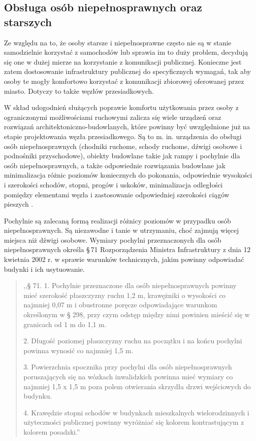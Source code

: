 \documentclass[twoside,12pt]{article}
\begin{document}
	 \clearpage
	 \subsection{Obsługa osób niepełnosprawnych oraz starszych}
	 
	 Ze względu na to, że osoby starsze i niepełnosprawne często nie są w stanie samodzielnie korzystać z samochodów lub sprawia im to duży problem, decydują się one w dużej mierze na korzystanie z komunikacji publicznej. Konieczne jest zatem dostosowanie infrastruktury publicznej do specyficznych wymagań, tak aby osoby te mogły komfortowo korzystać z komunikacji zbiorowej oferowanej przez miasto. Dotyczy to także węzłów przesiadkowych.
	 
	 W skład udogodnień służących poprawie komfortu użytkowania przez osoby z ograniczonymi możliwościami ruchowymi zalicza się wiele urządzeń oraz rozwiązań architektoniczno-budowlanych, które powinny być uwzględnione już na etapie projektowania węzła przesiadkowego. Są to m. in. urządzenia do obsługi osób niepełnosprawnych (chodniki ruchome, schody ruchome, dźwigi osobowe i podnośniki przyschodowe), obiekty budowlane takie jak rampy i pochylnie dla osób niepełnosprawnych, a także odpowiednie rozwiązania budowlane jak minimalizacja różnic poziomów koniecznych do pokonania, odpowiednie wysokości i szerokości schodów, stopni, progów i uskoków, minimalizacja odległości pomiędzy elementami węzła i zastosowanie odpowiedniej szerokości ciągów pieszych \cite{poznan}.
	 
	 Pochylnie są zalecaną formą realizacji różnicy poziomów w przypadku osób niepełnosprawnych. Są niezawodne i tanie w utrzymaniu, choć zajmują więcej miejsca niż dźwigi osobowe. Wymiary pochylni przeznaczonych dla osób niepełnosprawnych określa §\,71 Rozporządzenia Ministra Infrastruktury z dnia 12 kwietnia 2002 r.	w sprawie warunków technicznych, jakim powinny odpowiadać budynki i ich usytuowanie.
	 \begin{quote}
	 ,,§ 71. 1. Pochylnie przeznaczone dla osób niepełnosprawnych powinny mieć szerokość płaszczyzny ruchu 1,2 m, krawężniki o wysokości co najmniej 0,07 m i obustronne poręcze odpowiadające warunkom określonym w § 298, przy czym odstęp między nimi powinien mieścić się w granicach od 1 m do 1,1 m.
	 
2. Długość poziomej płaszczyzny ruchu na początku i na końcu pochylni powinna wynosić co najmniej 1,5 m.

3. Powierzchnia spocznika przy pochylni dla osób niepełnosprawnych poruszających się na wózkach inwalidzkich powinna mieć wymiary co najmniej 1,5 x 1,5 m poza polem otwierania skrzydła drzwi wejściowych do budynku.

4. Krawędzie stopni schodów w budynkach mieszkalnych wielorodzinnych i użyteczności publicznej powinny wyróżniać się kolorem kontrastującym z kolorem posadzki.'' \cite{warunki_techniczne}
	 \end{quote}
	 
\end{document}
